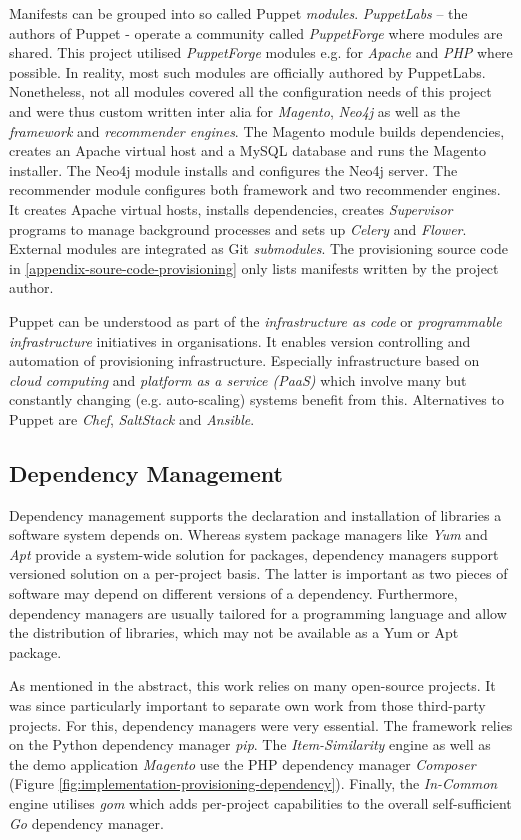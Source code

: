 Manifests can be grouped into so called Puppet \emph{modules}. \emph{PuppetLabs} -- the authors of Puppet - operate a community called \emph{PuppetForge} where modules are shared. This project utilised \emph{PuppetForge} modules e.g. for \emph{Apache} and \emph{PHP} where possible. In reality, most such modules are officially authored by PuppetLabs. Nonetheless, not all modules covered all the configuration needs of this project and were thus custom written inter alia for \emph{Magento}, \emph{Neo4j} as well as the \emph{framework} and \emph{recommender engines}. The Magento module builds dependencies, creates an Apache virtual host and a MySQL database and runs the Magento installer. The Neo4j module installs and configures the Neo4j server. The recommender module configures both framework and two recommender engines. It creates Apache virtual hosts, installs dependencies, creates \emph{Supervisor} programs to manage background processes and sets up \emph{Celery} and \emph{Flower}. External modules are integrated as Git \emph{submodules}. The provisioning source code in \ref{appendix-soure-code-provisioning} only lists manifests written by the project author.

Puppet can be understood as part of the \emph{infrastructure as code} or \emph{programmable infrastructure} initiatives in organisations. It enables version controlling and automation of provisioning infrastructure. Especially infrastructure based on \emph{cloud computing} and \emph{platform as a service (PaaS)} which involve many but constantly changing (e.g. auto-scaling) systems benefit from this. Alternatives to Puppet are \emph{Chef}, \emph{SaltStack} and \emph{Ansible}.

\subsection{Dependency Management}

Dependency management supports the declaration and installation of libraries a software system depends on. Whereas system package managers like \emph{Yum} and \emph{Apt} provide a system-wide solution for packages, dependency managers support versioned solution on a per-project basis. The latter is important as two pieces of software may depend on different versions of a dependency. Furthermore, dependency managers are usually tailored for a programming language and allow the distribution of libraries, which may not be available as a Yum or Apt package.

As mentioned in the abstract, this work relies on many open-source projects. It was since particularly important to separate own work from those third-party projects. For this, dependency managers were very essential. The framework relies on the Python dependency manager \emph{pip}. The \emph{Item-Similarity} engine as well as the demo application \emph{Magento} use the PHP dependency manager \emph{Composer} (Figure \ref{fig:implementation-provisioning-dependency}). Finally, the \emph{In-Common} engine utilises \emph{gom} which adds per-project capabilities to the overall self-sufficient \emph{Go} dependency manager.

